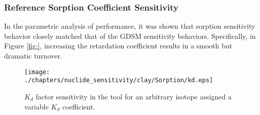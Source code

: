 
\subsubsection{Reference Sorption Coefficient Sensitivity}

In the parametric analysis of \Cyder performance, it was shown that sorption 
sensitivity behavior closely matched that of the \gls{GDSM} sensitivity 
behaviors. Specifically, in Figure \ref{fig:}, increasing the retardation 
coefficient results in a smooth but dramatic turnover. 

\begin{figure}[ht]
\centering
\texttt{[image: ./chapters/nuclide\_sensitivity/clay/Sorption/kd.eps]}
\caption{$K_d$ factor sensitivity in the \Cyder tool for an arbitrary isotope 
assigned a variable $K_d$ coefficient.}
\label{fig:kd_result}
\end{figure}
